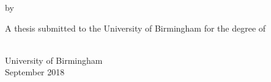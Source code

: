 \begin{titlepage}
    \begin{center}
        
        \vspace{3cm}
        \Huge
        \textbf{\thetitle}
        
        \vspace{0.5cm}
        \LARGE
        by
        
        \vspace{0.5cm}
        
        \textbf{\theauthor}
        
        \vspace{5cm}
        
        A thesis submitted to the University of Birmingham for the degree of\\\degree
        
        \end{center}
        
        \vspace{4.2cm}
        \raggedleft
        \Large
		\school \\
		University of Birmingham \\
		September 2018
        
\end{titlepage} 